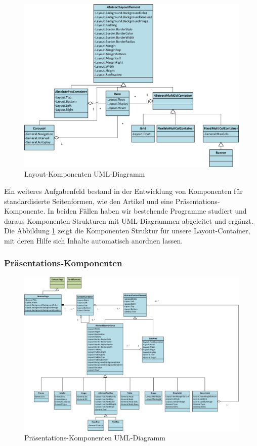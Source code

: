 \documentclass[12pt]{article}
\begin{document}
\begin{figure}[h]
	\centering
	\includegraphics[width=1.0\textwidth]{Layout.png}
	\caption{Layout-Komponenten UML-Diagramm}
	\label{fig:Layout}
\end{figure}

Ein weiteres Aufgabenfeld bestand in der Entwicklung von Komponenten für standardisierte Seitenformen, wie den Artikel und
eine Präsentations-Komponente. In beiden Fällen haben wir bestehende Programme studiert und daraus Komponenten-Strukturen
mit UML-Diagrammen abgeleitet und ergänzt. Die Abbildung \ref{fig:Layout} zeigt die Komponenten Struktur für unsere Layout-Container, mit deren
Hilfe sich Inhalte automatisch anordnen lassen.

\subsubsection{Präsentations-Komponenten}

\begin{figure}[h]
	\centering
	\includegraphics[width=1.0\textwidth]{Beamer.png}
	\caption{Präsentations-Komponenten UML-Diagramm}
	\label{fig:Beamer}
\end{figure}
\end{document}
